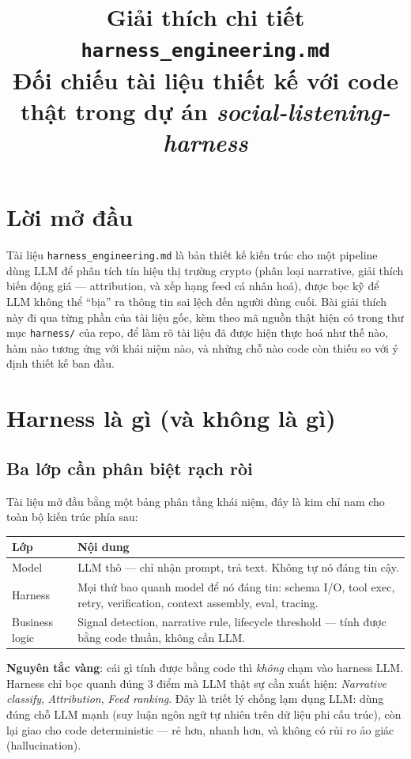 \documentclass[12pt,a4paper]{article}
\title{\textbf{Giải thích chi tiết \texttt{harness\_engineering.md}}\\[4pt]
\large Đối chiếu tài liệu thiết kế với code thật trong dự án \emph{social-listening-harness}}
\author{}
\date{}
\newcommand{\file}[1]{\texttt{#1}}
\begin{document}
\maketitle
\tableofcontents
\newpage

\section*{Lời mở đầu}

Tài liệu \file{harness\_engineering.md} là bản thiết kế kiến trúc cho một pipeline dùng LLM để phân
tích tín hiệu thị trường crypto (phân loại narrative, giải thích biến động giá — attribution, và
xếp hạng feed cá nhân hoá), được bọc kỹ để LLM không thể ``bịa'' ra thông tin sai lệch đến người
dùng cuối. Bài giải thích này đi qua từng phần của tài liệu gốc, kèm theo mã nguồn thật hiện có
trong thư mục \file{harness/} của repo, để làm rõ tài liệu đã được hiện thực hoá như thế nào, hàm
nào tương ứng với khái niệm nào, và những chỗ nào code còn thiếu so với ý định thiết kế ban đầu.

\section{Harness là gì (và không là gì)}

\subsection*{Ba lớp cần phân biệt rạch ròi}
Tài liệu mở đầu bằng một bảng phân tầng khái niệm, đây là kim chỉ nam cho toàn bộ kiến trúc phía sau:

\begin{center}
\begin{tabular}{|l|p{9.5cm}|}
\hline
\textbf{Lớp} & \textbf{Nội dung} \\
\hline
Model & LLM thô --- chỉ nhận prompt, trả text. Không tự nó đáng tin cậy. \\
\hline
Harness & Mọi thứ bao quanh model để nó đáng tin: schema I/O, tool exec, retry,
verification, context assembly, eval, tracing. \\
\hline
Business logic & Signal detection, narrative rule, lifecycle threshold --- tính được bằng
code thuần, không cần LLM. \\
\hline
\end{tabular}
\end{center}

\textbf{Nguyên tắc vàng}: cái gì tính được bằng code thì \emph{không} chạm vào harness LLM.
Harness chỉ bọc quanh đúng 3 điểm mà LLM thật sự cần xuất hiện: \emph{Narrative classify},
\emph{Attribution}, \emph{Feed ranking}. Đây là triết lý chống lạm dụng LLM: dùng đúng chỗ LLM
mạnh (suy luận ngôn ngữ tự nhiên trên dữ liệu phi cấu trúc), còn lại giao cho code deterministic
--- rẻ hơn, nhanh hơn, và không có rủi ro ảo giác (hallucination).
\end{document}
